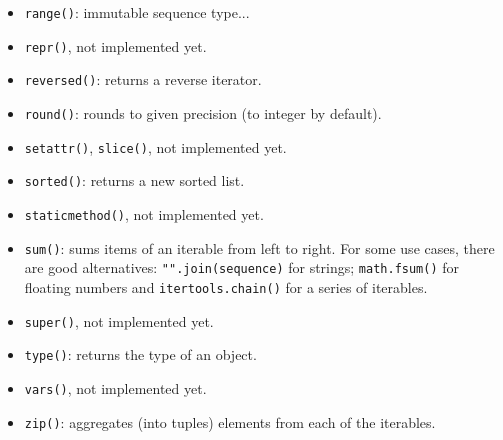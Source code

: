 \begin{itemize}
\item \texttt{range()}: immutable sequence type...

\item
\texttt{repr()},
\dotfill not implemented yet.

\item \texttt{reversed()}: returns a reverse iterator.

\item \texttt{round()}: rounds to given precision (to integer by default).

\item
\texttt{setattr()},
\texttt{slice()},
\dotfill not implemented yet.

\item \texttt{sorted()}: returns a new sorted list.

\item
\texttt{staticmethod()},
\dotfill not implemented yet.

\item \texttt{sum()}: sums items of an iterable from left to right.
For some use cases, there are good alternatives: \texttt{"".join(sequence)} for strings; \texttt{math.fsum()} for floating numbers and \texttt{itertools.chain()} for a series of iterables.

\item
\texttt{super()},
\dotfill not implemented yet.

\item \texttt{type()}: returns the type of an object.

\item
\texttt{vars()},
\dotfill not implemented yet.

\item \texttt{zip()}: aggregates (into tuples) elements from each of the iterables.
\end{itemize}

%
